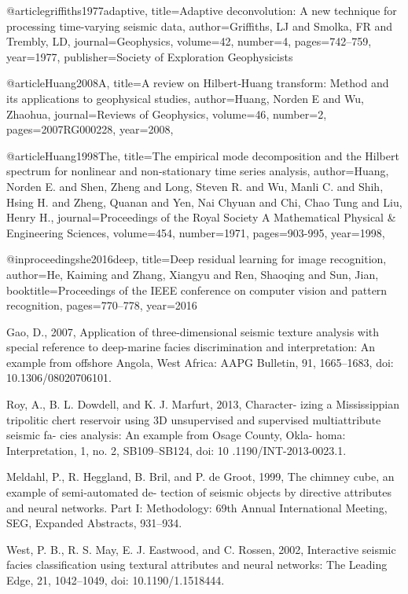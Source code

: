 @article{griffiths1977adaptive,
  title={Adaptive deconvolution: A new technique for processing time-varying seismic data},
  author={Griffiths, LJ and Smolka, FR and Trembly, LD},
  journal={Geophysics},
  volume={42},
  number={4},
  pages={742--759},
  year={1977},
  publisher={Society of Exploration Geophysicists}
}

@article{Huang2008A,
  title={A review on {H}ilbert‐{H}uang transform: {M}ethod and its applications to geophysical studies},
  author={Huang, Norden E and Wu, Zhaohua},
  journal={Reviews of Geophysics},
  volume={46},
  number={2},
  pages={2007RG000228},
  year={2008},
}

@article{Huang1998The,
  title={The empirical mode decomposition and the Hilbert spectrum for nonlinear and non-stationary time series analysis},
  author={Huang, Norden E. and Shen, Zheng and Long, Steven R. and Wu, Manli C. and Shih, Hsing H. and Zheng, Quanan and Yen, Nai Chyuan and Chi, Chao Tung and Liu, Henry H.},
  journal={Proceedings of the Royal Society A Mathematical Physical \& Engineering Sciences},
  volume={454},
  number={1971},
  pages={903-995},
  year={1998},
}

@inproceedings{he2016deep,
  title={Deep residual learning for image recognition},
  author={He, Kaiming and Zhang, Xiangyu and Ren, Shaoqing and Sun, Jian},
  booktitle={Proceedings of the IEEE conference on computer vision and pattern recognition},
  pages={770--778},
  year={2016}
}

Gao, D., 2007, Application of three-dimensional seismic texture analysis with special reference to deep-marine facies discrimination and interpretation: An example from offshore Angola, West Africa: AAPG Bulletin, 91, 1665–1683, doi: 10.1306/08020706101.

Roy, A., B. L. Dowdell, and K. J. Marfurt, 2013, Character- izing a Mississippian tripolitic chert reservoir using 3{D} unsupervised and supervised multiattribute seismic fa- cies analysis: An example from Osage County, Okla- homa: Interpretation, 1, no. 2, SB109–SB124, doi: 10 .1190/INT-2013-0023.1.

Meldahl, P., R. Heggland, B. Bril, and P. de Groot, 1999, The chimney cube, an example of semi‐automated de- tection of seismic objects by directive attributes and neural networks. Part I: Methodology: 69th Annual International Meeting, SEG, Expanded Abstracts, 931–934.

West, P. B., R. S. May, E. J. Eastwood, and C. Rossen, 2002, Interactive seismic facies classification using textural attributes and neural networks: The Leading Edge, 21, 1042–1049, doi: 10.1190/1.1518444.

